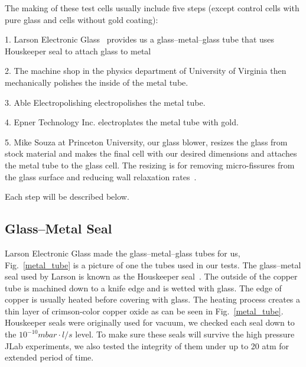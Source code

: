 The making of these test cells usually include five steps (except control cells with pure glass and cells without gold coating):

1. Larson Electronic Glass~\cite{Larson} provides us a glass--metal--glass tube that uses Houskeeper seal to attach glass to metal

2. The machine shop in the physics department of University of Virginia then mechanically polishes the inside of the metal tube.

3. Able Electropolishing electropolishes the metal tube.

4. Epner Technology Inc. electroplates the metal tube with gold.

5. Mike Souza at Princeton University, our glass blower, resizes the glass from stock material and makes the final cell with our desired dimensions and attaches the metal tube to the glass cell. The resizing is for removing micro-fissures from the glass surface and reducing wall relaxation rates~\cite{Cates1993}.

Each step will be described below.

\subsection{Glass--Metal Seal}

Larson Electronic Glass made the glass--metal--glass tubes for us, Fig.~\ref{metal_tube} is a picture of one the tubes used in our tests. The glass--metal seal used by Larson is known as the Houskeeper seal~\cite{Houskeeper}. The outside of the copper tube is machined down to a knife edge and is wetted with glass. The edge of copper is usually heated before covering with glass. The heating process creates a thin layer of crimson-color copper oxide as can be seen in Fig.~\ref{metal_tube}. Houskeeper seals were originally used for vacuum, we checked each seal down to the $10^{-10}mbar\cdot l/s$ level. To make sure these seals will survive the high pressure JLab experiments, we also tested the integrity of them under up to 20 atm for extended period of time.

